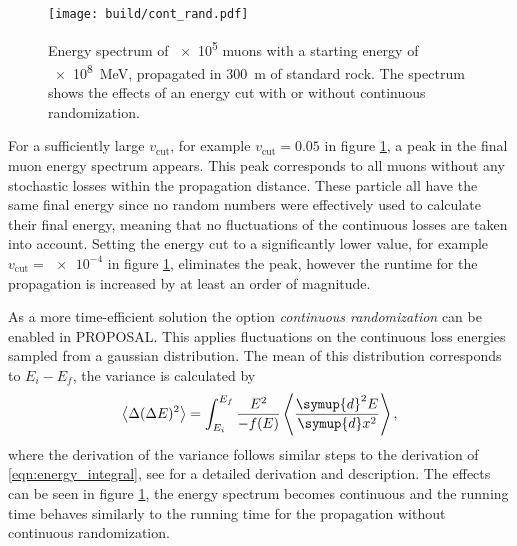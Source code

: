 \begin{figure}
    \centering
    \texttt{[image: build/cont\_rand.pdf]}
    \caption[Energy spectrum of \num{e5} muons with a starting energy of \SI{e8}{\mega\electronvolt}, propagated in \SI{300}{\meter} of standard rock. The spectrum shows the effects of an energy cut with or without continuous randomization.]{Energy spectrum of \num{e5} muons with a starting energy of \SI{e8}{\mega\electronvolt}, propagated in \SI{300}{\meter} of standard rock\protect\footnotemark. The spectrum shows the effects of an energy cut with or without continuous randomization.}
    \label{fig:cont_rand}
\end{figure}
For a sufficiently large $v_\text{cut}$, for example $v_\text{cut} = 0.05$ in figure \ref{fig:cont_rand}, a peak in the final muon energy spectrum appears.
This peak corresponds to all muons without any stochastic losses within the propagation distance.
These particle all have the same final energy since no random numbers were effectively used to calculate their final energy, meaning that no fluctuations of the continuous losses are taken into account.
Setting the energy cut to a significantly lower value, for example $v_\text{cut} = \num{e-4}$ in figure \ref{fig:cont_rand}, eliminates the peak, however the runtime for the propagation is increased by at least an order of magnitude.

As a more time-efficient solution the option \emph{continuous randomization} can be enabled in PROPOSAL.
This applies fluctuations on the continuous loss energies sampled from a gaussian distribution.
The mean of this distribution corresponds to $E_i - E_f$, the variance is calculated by
%
\begin{equation}
	\left< \Delta (\Delta E)^2 \right> = \int_{E_i}^{E_f} \frac{E^2}{-f(E)} \left< \frac{\symup{d}^2E}{\symup{d}x^2} \right>,
\end{equation}
%
where the derivation of the variance follows similar steps to the derivation of \eqref{eqn:energy_integral}, see \cite{chirkin2004propagating} for a detailed derivation and description. 
The effects can be seen in figure \ref{fig:cont_rand}, the energy spectrum becomes continuous and the running time behaves similarly to the running time for the propagation without continuous randomization.


